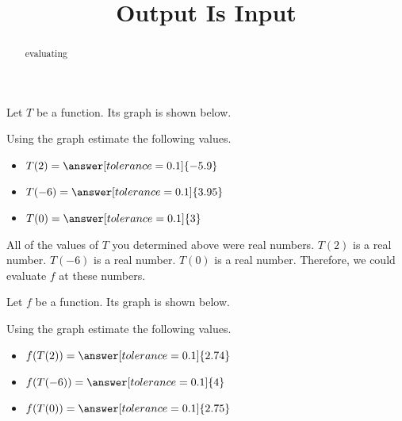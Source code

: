 \documentclass{ximera}
\title{Output Is Input}
\begin{document}
\begin{abstract}
evaluating
\end{abstract}
\maketitle



Let $T$ be a function.  Its graph is shown below. 

\begin{question}


Using the graph estimate the following values.


\begin{itemize}

\item $T(2) = \answer[tolerance=0.1]{-5.9}$ \\

\item $T(-6) = \answer[tolerance=0.1]{3.95}$ \\

\item $T(0) = \answer[tolerance=0.1]{3}$ \\

\end{itemize}


\end{question}

All of the values of $T$ you determined above were real numbers. $T(2)$ is a real number.  $T(-6)$ is a real number. $T(0)$ is a real number.  Therefore, we could evaluate $f$ at these numbers.

Let $f$ be a function.  Its graph is shown below. 


\begin{question}


Using the graph estimate the following values.


\begin{itemize}

\item $f(T(2)) = \answer[tolerance=0.1]{2.74}$ \\

\item $f(T(-6)) = \answer[tolerance=0.1]{4}$ \\

\item $f(T(0)) = \answer[tolerance=0.1]{2.75}$ \\

\end{itemize}


\end{question}
\end{document}
